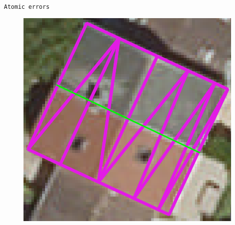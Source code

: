 \documentclass[12pt]{beamer}
\begin{document}
\begin{frame}{\texttt{Atomic errors}}
\begin{overlayarea}{\textwidth}{.5\textheight}
{\begin{figure}[H]
{{                                }{
                                    \includegraphics[height=.4\textheight]{images/errors/building/under_segmentation}
                                }
                            }{
                                }
\end{figure}}
\end{overlayarea}
\end{frame}
\end{document}
